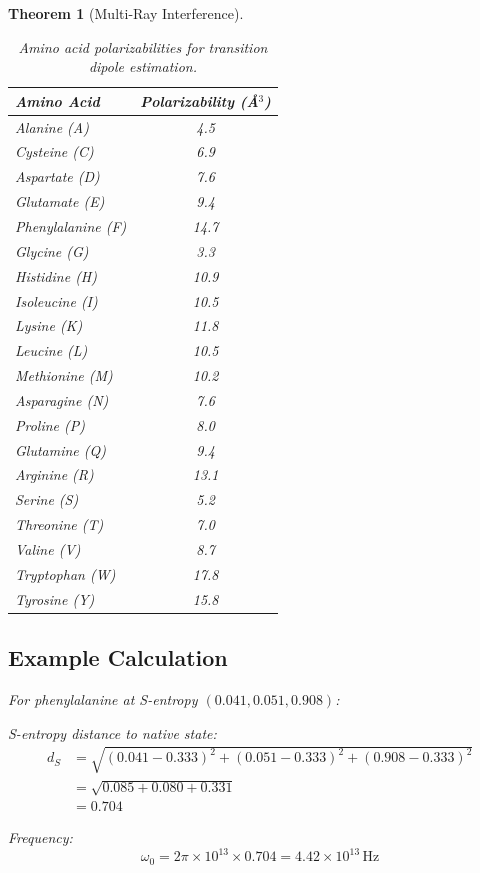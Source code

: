 \documentclass[11pt,a4paper]{article}
\newtheorem{theorem}{Theorem}[section]
\begin{document}
\begin{theorem}[Multi-Ray Interference]
\begin{table}[H]
\centering
\caption{Amino acid polarizabilities for transition dipole estimation.}
\small
\begin{tabular}{lc}
\hline
\textbf{Amino Acid} & \textbf{Polarizability} (\AA$^3$) \\
\hline
Alanine (A) & 4.5 \\
Cysteine (C) & 6.9 \\
Aspartate (D) & 7.6 \\
Glutamate (E) & 9.4 \\
Phenylalanine (F) & 14.7 \\
Glycine (G) & 3.3 \\
Histidine (H) & 10.9 \\
Isoleucine (I) & 10.5 \\
Lysine (K) & 11.8 \\
Leucine (L) & 10.5 \\
Methionine (M) & 10.2 \\
Asparagine (N) & 7.6 \\
Proline (P) & 8.0 \\
Glutamine (Q) & 9.4 \\
Arginine (R) & 13.1 \\
Serine (S) & 5.2 \\
Threonine (T) & 7.0 \\
Valine (V) & 8.7 \\
Tryptophan (W) & 17.8 \\
Tyrosine (Y) & 15.8 \\
\hline
\end{tabular}
\end{table}

\subsection{Example Calculation}

For phenylalanine at S-entropy $(0.041, 0.051, 0.908)$:

S-entropy distance to native state:
\begin{align}
d_S &= \sqrt{(0.041 - 0.333)^2 + (0.051 - 0.333)^2 + (0.908 - 0.333)^2} \\
&= \sqrt{0.085 + 0.080 + 0.331} \\
&= 0.704
\end{align}

Frequency:
\begin{equation}
\omega_0 = 2\pi \times 10^{13} \times 0.704 = 4.42 \times 10^{13} \, \text{Hz}
\end{equation}


\end{theorem}
\end{document}
